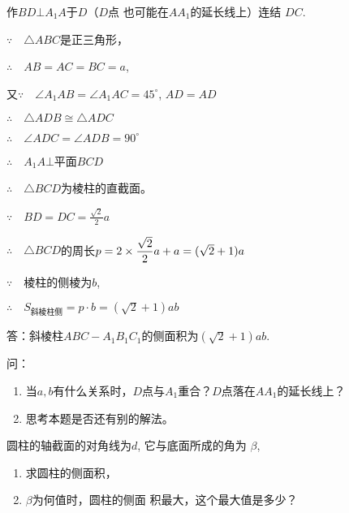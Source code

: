 \begin{solution}
作$BD\bot A_1A$于$D$（$D$点
也可能在$AA_1$的延长线上）连结
$DC$.

$\because\quad \triangle ABC$是正三角形，

$\therefore\quad AB=AC=BC=a$,

又$\because\quad \angle A_1AB=\angle A_1AC=45^{\circ}$, $AD=AD$

$\therefore\quad \triangle ADB\cong \triangle ADC$

$\therefore\quad \angle ADC=\angle ADB=90^{\circ}$

$\therefore\quad A_1A\bot$平面$BCD$

$\therefore\quad \triangle BCD$为棱柱的直截面。

$\because\quad BD=DC=\frac{\sqrt{2}}{2}a$

$\therefore\quad \triangle BCD$的周长$p=2\times\dfrac{\sqrt{2}}{2}a+a=(\sqrt{2}+1)a$

$\because\quad $棱柱的侧棱为$b$,

$\therefore\quad S_{\text{斜棱柱侧}}=p\cdot b=(\sqrt{2}+1)ab$

答：斜棱柱$ABC-A_1B_1C_1$的侧面积为$(\sqrt{2}+1)ab$.

问：
\begin{enumerate}
    \item 当$a,b$有什么关系时，$D$点与$A_1$重合？$D$点落在$AA_1$的延长线上？
    \item 思考本题是否还有别的解法。
\end{enumerate}
\end{solution}



\begin{example}
    圆柱的轴截面的对角线为$d$, 它与底面所成的角为
$\beta$,
\begin{enumerate}
    \item 求圆柱的侧面积，
    \item $\beta$为何值时，圆柱的侧面
积最大，这个最大值是多少？
\end{enumerate}
\end{example}

\begin{figure}[htp]
    \centering
{}
    \caption{}
\end{figure}


